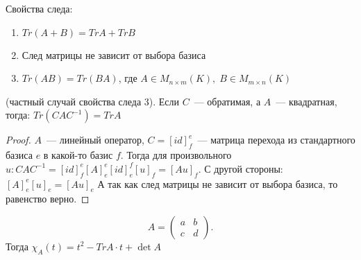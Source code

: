 \begin{remark}
    Свойства следа:
    \begin{enumerate}
        \item $Tr (A + B) = Tr A + Tr B$
        \item След матрицы не зависит от выбора базиса
        \item $Tr (AB) = Tr (BA)$, где $A \in M_{n \times m}(K), \; B \in M_{m \times n}(K)$
    \end{enumerate}
\end{remark}
\begin{statement}
    (частный случай свойства следа 3). Если $C$~--- обратимая, а $A$~--- квадратная, тогда:
    $Tr(C A C^{-1}) = Tr A$
\end{statement}
\begin{proof}
    $A$~--- линейный оператор, $C = [id]^e_f$~--- матрица перехода из стандартного базиса $e$ в какой-то базис $f$.
    Тогда для произвольного $u \colon C A C^{-1} = [id]^e_f[A]_e^e[id]_e^f[u]_f = [Au]_f$. С другой стороны: $[A]_e^e[u]_e = [Au]_e$
    А так как след матрицы не зависит от выбора базиса, то равенство верно.
\end{proof}
\begin{example}
    \[
    A = 
    \begin{pmatrix}
        a&b\\
        c&d
    \end{pmatrix}
    .\] 
    Тогда $\chi_A(t) = t^2 - Tr A\cdot t + \det A$
\end{example}
